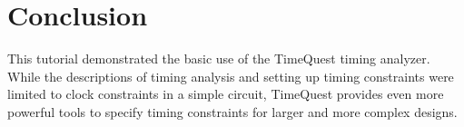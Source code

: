\documentclass[11pt, twoside, pdftex]{article}
\newcommand{\commonPath}{../../../Common}
\begin{document}
\section{Conclusion}

This tutorial demonstrated the basic use of the TimeQuest timing analyzer. While the descriptions 
of timing analysis and setting up timing constraints were limited to clock constraints in a 
simple circuit, TimeQuest provides even more powerful tools to specify timing constraints 
for larger and more complex designs.



\end{document}
